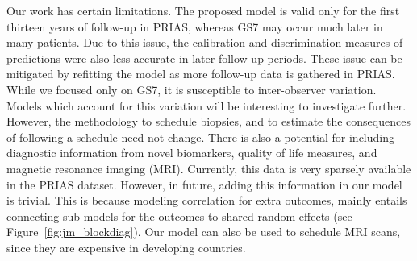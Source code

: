 Our work has certain limitations. The proposed model is valid only for the first thirteen years of follow-up in PRIAS, whereas GS7 may occur much later in many patients. Due to this issue, the calibration and discrimination measures of predictions were also less accurate in later follow-up periods. These issue can be mitigated by refitting the model as more follow-up data is gathered in PRIAS. While we focused only on GS7, it is susceptible to inter-observer variation. Models which account for this variation \citep{coley2017prediction,balasubramanian2003estimation} will be interesting to investigate further. However, the methodology to schedule biopsies, and to estimate the consequences of following a schedule need not change. There is also a potential for including diagnostic information from novel biomarkers, quality of life measures, and magnetic resonance imaging (MRI). Currently, this data is very sparsely available in the PRIAS dataset. However, in future, adding this information in our model is trivial. This is because modeling correlation for extra outcomes, mainly entails connecting sub-models for the outcomes to shared random effects (see Figure~\ref{fig:jm_blockdiag}). Our model can also be used to schedule MRI scans, since they are expensive in developing countries.